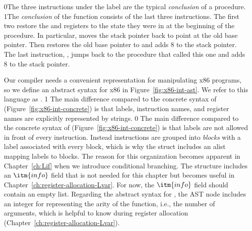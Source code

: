 \documentclass[7x10,nocrop]{TimesAPriori_MIT}%
\def\racketEd{0}
\def\pythonEd{1}
\def\edition{0}
\newcommand{\racket}[1]{{\if\edition\racketEd{#1}\fi}}
\newcommand{\python}[1]{{\if\edition\pythonEd #1\fi}}
\begin{document}
\racket{The three instructions under the label  are the
  typical \emph{conclusion} of a procedure.}
%
\python{The \emph{conclusion}\index{subject}{conclusion} of the
  \code{main} function consists of the last three instructions.}
%
The first two restore the  and  registers to the
state they were in at the beginning of the procedure. In particular,
 moves the stack pointer back to point at the
old base pointer. Then  restores the old base pointer
to  and adds $8$ to the stack pointer.  The last instruction,
, jumps back to the procedure that called this one and adds
$8$ to the stack pointer.

Our compiler needs a convenient representation for manipulating x86
programs, so we define an abstract syntax for x86 in
Figure~\ref{fig:x86-int-ast}. We refer to this language as
\LangXInt{}.
%
{\if\edition\pythonEd%
  The main difference compared to the concrete syntax of \LangXInt{}
  (Figure~\ref{fig:x86-int-concrete}) is that labels, instruction
  names, and register names are explicitly represented by strings. 
\fi} %
{\if\edition\racketEd  
The main difference compared to the concrete syntax of \LangXInt{}
(Figure~\ref{fig:x86-int-concrete}) is that labels are not allowed in
front of every instruction. Instead instructions are grouped into
\emph{blocks} with a
label associated with every block, which is why the 
struct includes an alist mapping labels to blocks. The reason for this
organization becomes apparent in Chapter~\ref{ch:Lif} when we
introduce conditional branching. The  structure includes
an $\itm{info}$ field that is not needed for this chapter but becomes
useful in Chapter~\ref{ch:register-allocation-Lvar}.  For now, the
$\itm{info}$ field should contain an empty list.
\fi}
%
Regarding the abstract syntax for , the  AST
node includes an integer for representing the arity of the function,
i.e., the number of arguments, which is helpful to know during
register allocation (Chapter~\ref{ch:register-allocation-Lvar}).

\newcommand{\allastregisters}{\skey{rsp} \MID \skey{rbp} \MID \skey{rax} \MID \skey{rbx} \MID \skey{rcx}
              \MID \skey{rdx} \MID \skey{rsi} \MID \skey{rdi} \MID \\
              && \skey{r8} \MID \skey{r9} \MID \skey{r10}
              \MID \skey{r11} \MID \skey{r12} \MID \skey{r13}
              \MID \skey{r14} \MID \skey{r15}}
\end{document}
